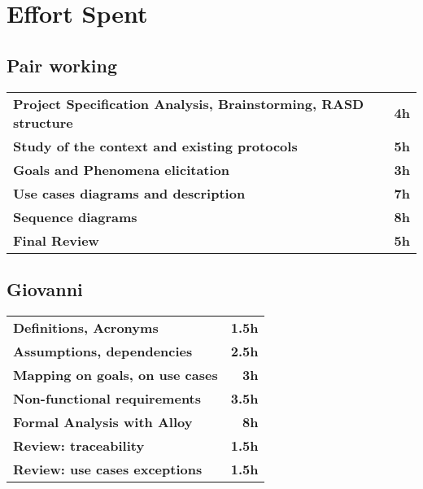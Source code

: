 \section{Effort Spent}
\subsection*{Pair working}
\begin{table}[H]
    \begin{tabular}{lr}
        \toprule
        \textbf{Project Specification Analysis, Brainstorming, RASD structure} & \textbf{4h} \\
        \textbf{Study of the context and existing protocols}                   & \textbf{5h} \\
        \textbf{Goals and Phenomena elicitation}                               & \textbf{3h} \\
        \textbf{Use cases diagrams and description}                            & \textbf{7h} \\
        \textbf{Sequence diagrams}                                             & \textbf{8h} \\
        \textbf{Final Review}                                                  & \textbf{5h} \\
        \bottomrule
    \end{tabular}
\end{table}

\subsection*{Giovanni}
\begin{table}[H]
    \begin{tabular}{lr}
        \toprule
        \textbf{Definitions, Acronyms}          & \textbf{1.5h} \\
        \textbf{Assumptions, dependencies}      & \textbf{2.5h} \\
        \textbf{Mapping on goals, on use cases} & \textbf{3h}   \\
        \textbf{Non-functional requirements}    & \textbf{3.5h} \\
        \textbf{Formal Analysis with Alloy}     & \textbf{8h}   \\
        \textbf{Review: traceability}           & \textbf{1.5h} \\
        \textbf{Review: use cases exceptions}   & \textbf{1.5h} \\
        \bottomrule
    \end{tabular}
\end{table}

